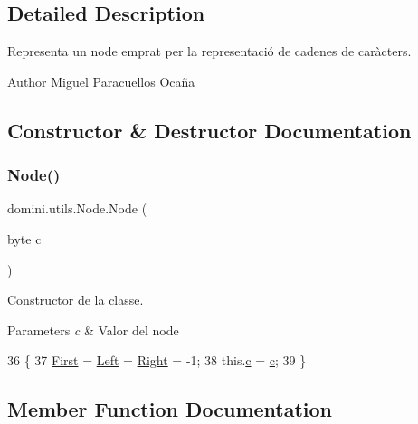 \subsection{Detailed Description}
Representa un node emprat per la representació de cadenes de caràcters. 

\begin{DoxyAuthor}{Author}
Miguel Paracuellos Ocaña 
\end{DoxyAuthor}


\subsection{Constructor \& Destructor Documentation}
\mbox{\label{classdomini_1_1utils_1_1Node_ae337ba617322158f0ac240c900350278}} 
\subsubsection{\texorpdfstring{Node()}{Node()}}
{\footnotesize\ttfamily domini.\+utils.\+Node.\+Node (\begin{DoxyParamCaption}\item[{byte}]{c }\end{DoxyParamCaption})\hspace{0.3cm}{\ttfamily [inline]}}



Constructor de la classe. 


\begin{DoxyParams}{Parameters}
{\em c} & Valor del node \\
\hline
\end{DoxyParams}

\begin{DoxyCode}
36                         \{
37         \hyperlink{classdomini_1_1utils_1_1Node_a42db9f259f129c72cab2052a0f8ba42a}{First} = \hyperlink{classdomini_1_1utils_1_1Node_a2f1d911cf52953b29d42e5e020b82dbf}{Left} = \hyperlink{classdomini_1_1utils_1_1Node_a73c97e595bad2513ee0a06ee4620236a}{Right} = -1;
38         this.\hyperlink{classdomini_1_1utils_1_1Node_a2fbef2557db813ae02a2d52032eaa6e1}{c} = \hyperlink{classdomini_1_1utils_1_1Node_a2fbef2557db813ae02a2d52032eaa6e1}{c};
39     \}
\end{DoxyCode}


\subsection{Member Function Documentation}
\mbox{\label{classdomini_1_1utils_1_1Node_a3fe2e958308c90d24607a4e191680089}} 
